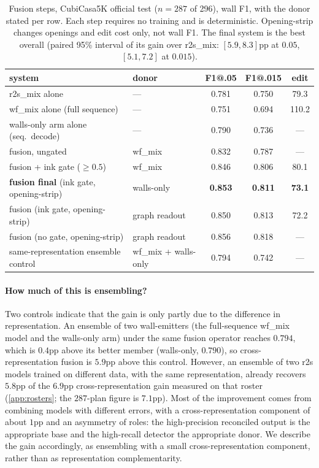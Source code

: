 \documentclass{article}
\newcommand{\tbf}[1]{\textbf{#1}}
\begin{document}
\begin{table}[t]
\centering
\caption{Fusion steps, CubiCasa5K official test ($n{=}287$ of 296), wall F1, with
the donor stated per row. Each step requires no training and is deterministic.
Opening-strip changes openings and edit cost only, not wall F1. The final
system is the best overall (paired 95\% interval of its gain over r2s\_mix:
$[5.9,8.3]$pp at $0.05$, $[5.1,7.2]$ at $0.015$).}
\label{tab:fusion}
\small
\begin{tabular}{llccc}
\toprule
system & donor & F1@.05 & F1@.015 & edit \\
\midrule
r2s\_mix alone                       & --- & 0.781 & 0.750 & 79.3 \\
wf\_mix alone (full sequence)        & --- & 0.751 & 0.694 & 110.2 \\
walls-only arm alone (seq.\ decode)  & --- & 0.790 & 0.736 & --- \\
fusion, ungated                      & wf\_mix & 0.832 & 0.787 & --- \\
fusion + ink gate ($\ge0.5$)         & wf\_mix & 0.846 & 0.806 & 80.1 \\
\tbf{fusion final} (ink gate, opening-strip) & walls-only & \tbf{0.853} & \tbf{0.811} & \tbf{73.1} \\
fusion (ink gate, opening-strip)     & graph readout & 0.850 & 0.813 & 72.2 \\
fusion (no gate, opening-strip)      & graph readout & 0.856 & 0.818 & --- \\
\midrule
same-representation ensemble control & wf\_mix + walls-only & 0.794 & 0.742 & --- \\
\bottomrule
\end{tabular}
\end{table}

\paragraph{How much of this is ensembling?} Two controls indicate that the
gain is only partly due to the difference in representation. An ensemble of two
wall-emitters (the full-sequence wf\_mix model and the walls-only arm) under
the same fusion operator reaches $0.794$, which is $0.4$pp above its better
member (walls-only, $0.790$), so cross-representation fusion is $5.9$pp above
this control. However, an ensemble of two r2s models trained on different data, with
the same representation, already recovers $5.8$pp of the $6.9$pp
cross-representation gain measured on that roster (\cref{app:rosters}; the
$287$-plan figure is $7.1$pp). Most of the improvement comes from
combining models with different errors, with a cross-representation component
of about $1$pp and an asymmetry of roles: the high-precision reconciled output
is the appropriate base and the high-recall detector the appropriate donor. We
describe the gain accordingly, as ensembling with a small cross-representation
component, rather than as representation complementarity.
\end{document}
